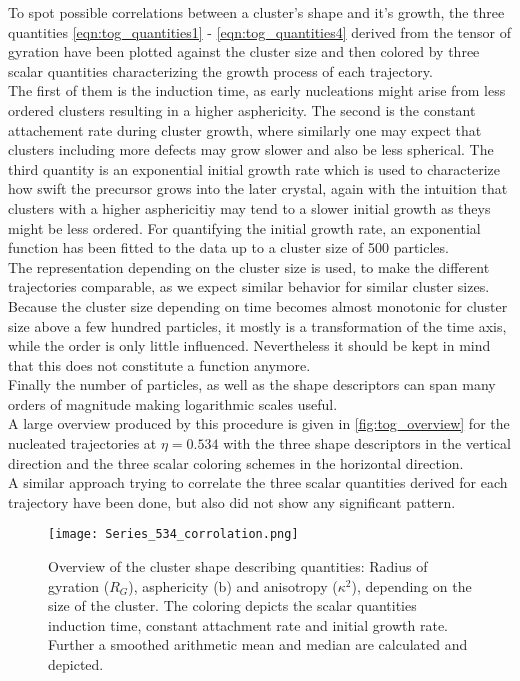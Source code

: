 To spot possible correlations between a cluster's shape and it's growth, the three quantities \autoref{eqn:tog_quantities1} - \ref{eqn:tog_quantities4} derived from the tensor of gyration have been plotted against the cluster size and then colored by three scalar quantities characterizing the growth process of each trajectory.\\ 
The first of them is the induction time, as early nucleations might arise from less ordered clusters resulting in a higher asphericity. The second is the constant attachement rate during cluster growth, where similarly one may expect that clusters including more defects may grow slower and also be less spherical. The third quantity is an exponential initial growth rate which is used to characterize how swift the precursor grows into the later crystal, again with the intuition that clusters with a higher asphericitiy may tend to a slower initial growth as theys might be less ordered. For quantifying the initial growth rate, an exponential function has been fitted to the data up to a cluster size of 500 particles.\\
The representation depending on the cluster size is used, to make the different trajectories comparable, as we expect similar behavior for similar cluster sizes. Because the cluster size depending on time becomes almost monotonic for cluster size above a few hundred particles, it mostly is a transformation of the time axis, while the order is only little influenced. Nevertheless it should be kept in mind that this does not constitute a function anymore.\\
Finally the number of particles, as well as the shape descriptors can span many orders of magnitude making logarithmic scales useful.\\

A large overview produced by this procedure is given in \autoref{fig:tog_overview} for the nucleated trajectories at $\eta=0.534$ with the three shape descriptors in the vertical direction and the three scalar coloring schemes in the horizontal direction.\\

A similar approach trying to correlate the three scalar quantities derived for each trajectory have been done, but also did not show any significant pattern.  

\begin{figure}[!h]
\centering
\texttt{[image: Series\_534\_corrolation.png]}
\caption[Tensor of gyration measurements from production data]{Overview of the cluster shape describing quantities: Radius of gyration ($R_G$), asphericity (b) and anisotropy ($\kappa^2$), depending on the size of the cluster. The coloring depicts the scalar quantities induction time, constant attachment rate and initial growth rate. Further a smoothed arithmetic mean and median are calculated and depicted.}
\label{fig:tog_overview}
\end{figure}


